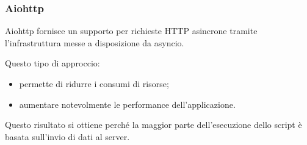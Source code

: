 \subsubsection{Aiohttp}
Aiohttp fornisce un supporto per richieste HTTP asincrone tramite l'infrastruttura messe a disposizione da asyncio.

Questo tipo di approccio:
\begin{itemize}
	\item permette di ridurre i consumi di risorse;
	\item aumentare notevolmente le performance dell'applicazione.
\end{itemize}
Questo risultato si ottiene perché la maggior parte dell'esecuzione dello script è basata sull'invio di dati al server.

